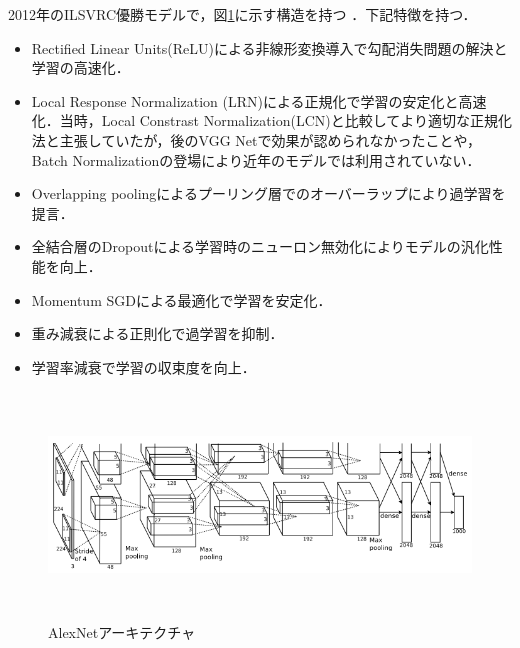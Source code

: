 2012年のILSVRC優勝モデルで，図\ref{arch_alexnet}に示す構造を持つ \cite{paper_alexnet}．下記特徴を持つ．

\begin{itemize}
	\item Rectified Linear Units(ReLU)による非線形変換導入で勾配消失問題の解決と学習の高速化．
	\item Local Response Normalization (LRN)による正規化で学習の安定化と高速化．当時，Local Constrast Normalization(LCN)と比較してより適切な正規化法と主張していたが，後のVGG Netで効果が認められなかったことや，Batch Normalizationの登場により近年のモデルでは利用されていない．
	\item Overlapping poolingによるプーリング層でのオーバーラップにより過学習を提言．
	\item 全結合層のDropoutによる学習時のニューロン無効化によりモデルの汎化性能を向上．
	\item Momentum SGDによる最適化で学習を安定化．
	\item 重み減衰による正則化で過学習を抑制．
	\item 学習率減衰で学習の収束度を向上．
\end{itemize}

\begin{figure} [H]
	\begin{center}
		\includegraphics[clip, height=6cm, bb=-20 0 675 219]{data/figure/arch_alexnet.png}
		\caption{AlexNetアーキテクチャ}
		\label{arch_alexnet}
	\end{center}
\end{figure}
